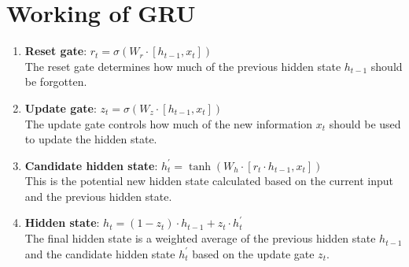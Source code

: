 \section{Working of GRU}

\begin{enumerate}
    \item \textbf{Reset gate}: $r_t=\sigma(W_r \cdot [h_{t-1},x_t])$
    \hfill \cite{geeksforgeeks/machine-learning/gated-recurrent-unit-networks}
    \\[0.2cm]
    The reset gate determines how much of the previous hidden state $h_{t-1}$ should be forgotten.
    \hfill \cite{geeksforgeeks/machine-learning/gated-recurrent-unit-networks}

    \item \textbf{Update gate}: $ z_t=\sigma(W_z \cdot [h_{t-1},x_t]) $
    \hfill \cite{geeksforgeeks/machine-learning/gated-recurrent-unit-networks}
    \\[0.2cm]
    The update gate controls how much of the new information $x_t$ should be used to update the hidden state.
    \hfill \cite{geeksforgeeks/machine-learning/gated-recurrent-unit-networks}

    \item \textbf{Candidate hidden state}: $ h_t^\prime=\tanh(W_h \cdot [r_t \cdot h_{t-1},x_t]) $
    \hfill \cite{geeksforgeeks/machine-learning/gated-recurrent-unit-networks}
    \\[0.2cm]
    This is the potential new hidden state calculated based on the current input and the previous hidden state.
    \hfill \cite{geeksforgeeks/machine-learning/gated-recurrent-unit-networks}

    \item \textbf{Hidden state}: $ h_t=(1-z_t) \cdot h_{t-1}+z_t \cdot h_t^\prime $
    \hfill \cite{geeksforgeeks/machine-learning/gated-recurrent-unit-networks}
    \\[0.2cm]
    The final hidden state is a weighted average of the previous hidden state $h_{t-1}$ and the candidate hidden state $h_t^\prime$ based on the update gate $z_t$.
    \hfill \cite{geeksforgeeks/machine-learning/gated-recurrent-unit-networks}
\end{enumerate}


